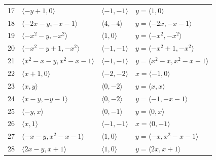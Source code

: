 \documentclass[11pt]{article}
\begin{document}
\begin{longtable}{@{}rlll@{}}
17 & $\langle -y+1,0\rangle$ & $\langle -1,-1\rangle$ & $y=\langle 1,0\rangle$\\
18 & $\langle -2x-y,-x-1\rangle$ & $\langle 4,-4\rangle$ & $y=\langle -2x,-x-1\rangle$\\
19 & $\langle -x^{2}-y,-x^{2}\rangle$ & $\langle 1,0\rangle$ & $y=\langle -x^{2},-x^{2}\rangle$\\
20 & $\langle -x^{2}-y+1,-x^{2}\rangle$ & $\langle -1,-1\rangle$ & $y=\langle -x^{2}+1,-x^{2}\rangle$\\
21 & $\langle x^{2}-x-y,x^{2}-x-1\rangle$ & $\langle -1,-1\rangle$ & $y=\langle x^{2}-x,x^{2}-x-1\rangle$\\
22 & $\langle x+1,0\rangle$ & $\langle -2,-2\rangle$ & $x=\langle -1,0\rangle$\\
23 & $\langle x,y\rangle$ & $\langle 0,-2\rangle$ & $y=\langle x,x\rangle$\\
24 & $\langle x-y,-y-1\rangle$ & $\langle 0,-2\rangle$ & $y=\langle -1,-x-1\rangle$\\
25 & $\langle -y,x\rangle$ & $\langle 0,-1\rangle$ & $y=\langle 0,x\rangle$\\
26 & $\langle x,1\rangle$ & $\langle -1,-1\rangle$ & $x=\langle 0,-1\rangle$\\
27 & $\langle -x-y,x^{2}-x-1\rangle$ & $\langle 1,0\rangle$ & $y=\langle -x,x^{2}-x-1\rangle$\\
28 & $\langle 2x-y,x+1\rangle$ & $\langle 1,0\rangle$ & $y=\langle 2x,x+1\rangle$\\
\end{longtable}
\endgroup
\end{document}
